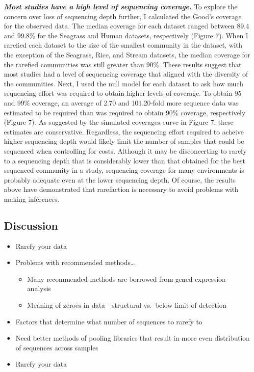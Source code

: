 \documentclass[
]{article}
\providecommand{\tightlist}{%
  \setlength{\itemsep}{0pt}\setlength{\parskip}{0pt}}
\begin{document}
\textbf{\emph{Most studies have a high level of sequencing coverage.}}
To explore the concern over loss of sequencing depth further, I
calculated the Good's coverage for the observed data. The median
coverage for each dataset ranged between 89.4 and 99.8\% for the
Seagrass and Human datasets, respectively (Figure 7). When I rarefied
each dataset to the size of the smallest community in the dataset, with
the exception of the Seagrass, Rice, and Stream datasets, the median
coverage for the rarefied communities was still greater than 90\%. These
results suggest that most studies had a level of sequencing coverage
that aligned with the diversity of the communities. Next, I used the
null model for each dataset to ask how much sequencing effort was
required to obtain higher levels of coverage. To obtain 95 and 99\%
coverage, an average of 2.70 and 101.20-fold more sequence data was
estimated to be required than was required to obtain 90\% coverage,
respectively (Figure 7). As suggested by the simulated coverages curve
in Figure 7, these estimates are conservative. Regardless, the
sequencing effort required to acheive higher sequencing depth would
likely limit the number of samples that could be sequenced when
controlling for costs. Although it may be disconcerting to rarefy to a
sequencing depth that is considerably lower than that obtained for the
best sequenced community in a study, sequencing coverage for many
environments is probably adequate even at the lower sequencing depth. Of
course, the results above have demonstrated that rarefaction is
necessary to avoid problems with making inferences.

\hypertarget{discussion}{%
\subsection{Discussion}\label{discussion}}

\begin{itemize}
\tightlist
\item
  Rarefy your data
\item
  Problems with recommended methods\ldots{}

  \begin{itemize}
  \tightlist
  \item
    Many recommended methods are borrowed from gened expression analysis
  \item
    Meaning of zeroes in data - structural vs.~below limit of detection
  \end{itemize}
\item
  Factors that determine what number of sequences to rarefy to
\item
  Need better methods of pooling libraries that result in more even
  distribution of sequences across samples
\item
  Rarefy your data
\end{itemize}
\end{document}
